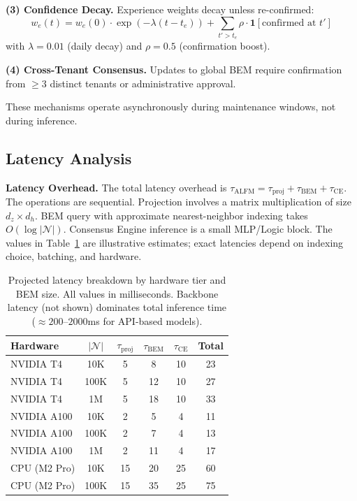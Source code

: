 \documentclass[twoside,11pt]{article}
\newcommand{\N}{\mathcal{N}}
\begin{document}
\textbf{(3) Confidence Decay.} Experience weights decay unless re-confirmed:
\begin{equation}
    w_e(t) = w_e(0) \cdot \exp(-\lambda(t - t_e)) + \sum_{t' > t_e} \rho \cdot \mathbf{1}[\text{confirmed at } t']
\end{equation}
with $\lambda = 0.01$ (daily decay) and $\rho = 0.5$ (confirmation boost).

\textbf{(4) Cross-Tenant Consensus.} Updates to global BEM require confirmation from $\geq 3$ distinct tenants or administrative approval.

These mechanisms operate asynchronously during maintenance windows, not during inference.

\subsection{Latency Analysis}
\label{sec:latency}

\textbf{Latency Overhead.} The total latency overhead is $\tau_{\mathrm{ALFM}} = \tau_{\mathrm{proj}} + \tau_{\mathrm{BEM}} + \tau_{\mathrm{CE}}$. The operations are sequential. Projection involves a matrix multiplication of size $d_z \times d_h$. BEM query with approximate nearest-neighbor indexing takes $O(\log |\N|)$. Consensus Engine inference is a small MLP/Logic block. The values in Table~\ref{tab:latency} are illustrative estimates; exact latencies depend on indexing choice, batching, and hardware.

\begin{table}[htbp]
    \centering
    \caption{Projected latency breakdown by hardware tier and BEM size. All values in milliseconds. Backbone latency (not shown) dominates total inference time ($\approx 200$--$2000$ms for API-based models).}
    \label{tab:latency}
    \begin{tabular}{l c c c c c}
        \toprule
        \textbf{Hardware} & \textbf{$|\N|$} & $\tau_{\mathrm{proj}}$ & $\tau_{\mathrm{BEM}}$ & $\tau_{\mathrm{CE}}$ & \textbf{Total} \\
        \midrule
        NVIDIA T4 & 10K & 5 & 8 & 10 & 23 \\
        NVIDIA T4 & 100K & 5 & 12 & 10 & 27 \\
        NVIDIA T4 & 1M & 5 & 18 & 10 & 33 \\
        \midrule
        NVIDIA A100 & 10K & 2 & 5 & 4 & 11 \\
        NVIDIA A100 & 100K & 2 & 7 & 4 & 13 \\
        NVIDIA A100 & 1M & 2 & 11 & 4 & 17 \\
        \midrule
        CPU (M2 Pro) & 10K & 15 & 20 & 25 & 60 \\
        CPU (M2 Pro) & 100K & 15 & 35 & 25 & 75 \\
        \bottomrule
    \end{tabular}
\end{table}
\end{document}
